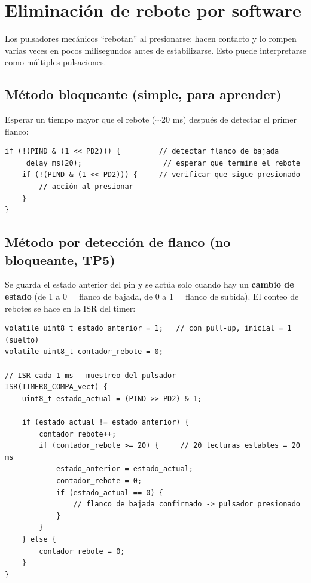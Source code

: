 \section{Eliminación de rebote por software}

Los pulsadores mecánicos ``rebotan'' al presionarse: hacen contacto y lo rompen
varias veces en pocos milisegundos antes de estabilizarse. Esto puede interpretarse
como múltiples pulsaciones.

\subsection{Método bloqueante (simple, para aprender)}

Esperar un tiempo mayor que el rebote ($\sim$20 ms) después de detectar el primer
flanco:

\begin{lstlisting}[style=estilo-c]
if (!(PIND & (1 << PD2))) {         // detectar flanco de bajada
    _delay_ms(20);                   // esperar que termine el rebote
    if (!(PIND & (1 << PD2))) {     // verificar que sigue presionado
        // acción al presionar
    }
}
\end{lstlisting}

\subsection{Método por detección de flanco (no bloqueante, TP5)}

Se guarda el estado anterior del pin y se actúa solo cuando hay un \textbf{cambio de
estado} (de 1 a 0 = flanco de bajada, de 0 a 1 = flanco de subida). El conteo de
rebotes se hace en la ISR del timer:

\begin{lstlisting}[style=estilo-c]
volatile uint8_t estado_anterior = 1;   // con pull-up, inicial = 1 (suelto)
volatile uint8_t contador_rebote = 0;

// ISR cada 1 ms — muestreo del pulsador
ISR(TIMER0_COMPA_vect) {
    uint8_t estado_actual = (PIND >> PD2) & 1;

    if (estado_actual != estado_anterior) {
        contador_rebote++;
        if (contador_rebote >= 20) {     // 20 lecturas estables = 20 ms
            estado_anterior = estado_actual;
            contador_rebote = 0;
            if (estado_actual == 0) {
                // flanco de bajada confirmado -> pulsador presionado
            }
        }
    } else {
        contador_rebote = 0;
    }
}
\end{lstlisting}

